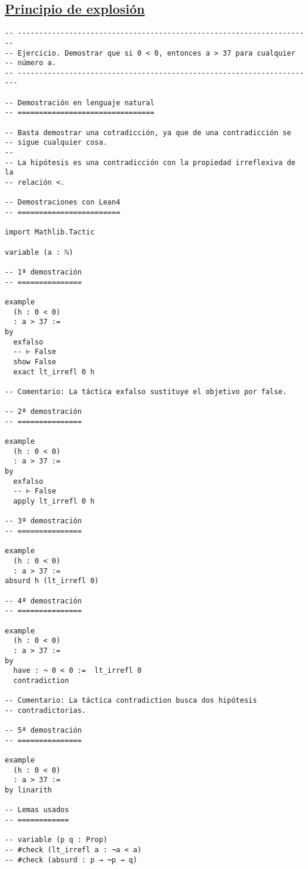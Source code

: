 \subsection{\href{./src/Logica/Principio\_de\_explosion.lean}{Principio de explosión}}
\label{sec:org7ac47fc}
\begin{verbatim}
-- ---------------------------------------------------------------------
-- Ejercicio. Demostrar que si 0 < 0, entonces a > 37 para cualquier
-- número a.
-- ----------------------------------------------------------------------

-- Demostración en lenguaje natural
-- ================================

-- Basta demostrar una cotradicción, ya que de una contradicción se
-- sigue cualquier cosa.
--
-- La hipótesis es una contradicción con la propiedad irreflexiva de la
-- relación <.

-- Demostraciones con Lean4
-- ========================

import Mathlib.Tactic

variable (a : ℕ)

-- 1ª demostración
-- ===============

example
  (h : 0 < 0)
  : a > 37 :=
by
  exfalso
  -- ⊢ False
  show False
  exact lt_irrefl 0 h

-- Comentario: La táctica exfalso sustituye el objetivo por false.

-- 2ª demostración
-- ===============

example
  (h : 0 < 0)
  : a > 37 :=
by
  exfalso
  -- ⊢ False
  apply lt_irrefl 0 h

-- 3ª demostración
-- ===============

example
  (h : 0 < 0)
  : a > 37 :=
absurd h (lt_irrefl 0)

-- 4ª demostración
-- ===============

example
  (h : 0 < 0)
  : a > 37 :=
by
  have : ¬ 0 < 0 :=  lt_irrefl 0
  contradiction

-- Comentario: La táctica contradiction busca dos hipótesis
-- contradictorias.

-- 5ª demostración
-- ===============

example
  (h : 0 < 0)
  : a > 37 :=
by linarith

-- Lemas usados
-- ============

-- variable (p q : Prop)
-- #check (lt_irrefl a : ¬a < a)
-- #check (absurd : p → ¬p → q)
\end{verbatim}

